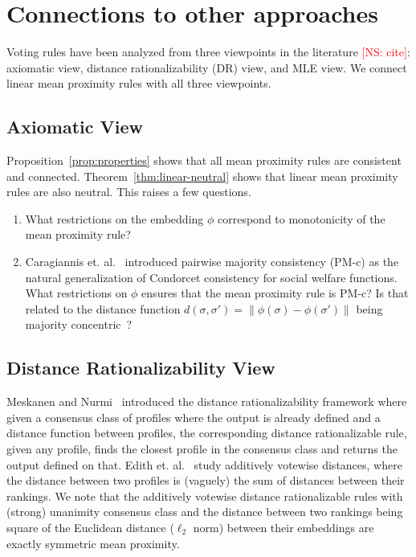 \documentclass[10pt,letterpaper]{article}
\newcommand{\kibitz}[2]{\ifnum\Comments=1\textcolor{#1}{#2}\fi}
\newcommand{\cns}[1]{\kibitz{red} {[NS: #1]}}
\begin{document}


\section{Connections to other approaches}
Voting rules have been analyzed from three viewpoints in the literature \cns{cite}: axiomatic view, distance rationalizability (DR) view, and MLE view. We connect linear mean proximity rules with all three viewpoints.


\subsection{Axiomatic View}
Proposition~\ref{prop:properties} shows that all mean proximity rules are consistent and connected. Theorem~\ref{thm:linear-neutral} shows that linear mean proximity rules are also neutral. This raises a few questions.

\begin{enumerate}
\item What restrictions on the embedding $\phi$ correspond to monotonicity of the mean proximity rule?
\item Caragiannis et. al.~\cite{CPS13} introduced pairwise majority consistency (PM-c) as the natural generalization of Condorcet consistency for social welfare functions. What restrictions on $\phi$ ensures that the mean proximity rule is PM-c? Is that related to the distance function $d(\sigma,\sigma') = \|\phi(\sigma)-\phi(\sigma')\|$ being majority concentric~\cite{CPS13}?
\end{enumerate}


\subsection{Distance Rationalizability View}
Meskanen and Nurmi~\cite{MN08} introduced the distance rationalizability framework where given a consensus class of profiles where the output is already defined and a distance function between profiles, the corresponding distance rationalizable rule, given any profile, finds the closest profile in the consensus class and returns the output defined on that. Edith et. al.~\cite{EFS10} study additively votewise distances, where the distance between two profiles is (vaguely) the sum of distances between their rankings. We note that the additively votewise distance rationalizable rules with (strong) unanimity consensus class and the distance between two rankings being square of the Euclidean distance ($\ell_2$ norm) between their embeddings are exactly symmetric mean proximity. 
\end{document}
